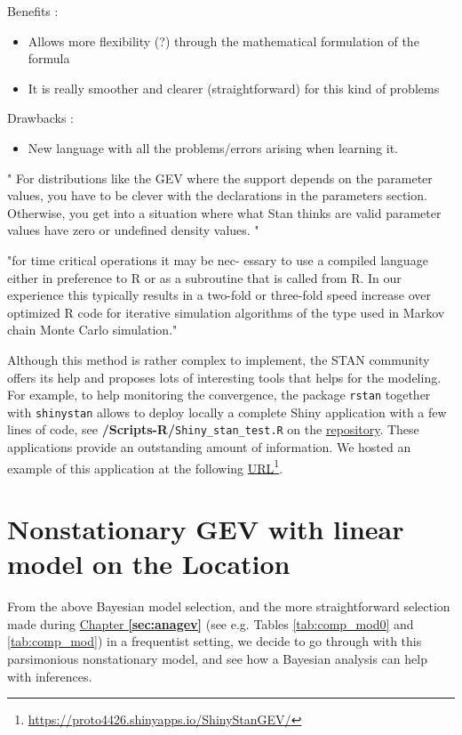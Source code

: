  Benefits : 
 
 \begin{itemize}
 	\item Allows more flexibility (?) through the mathematical formulation of the formula
 	\item It is really smoother and clearer (straightforward) for this kind of problems 
 \end{itemize}
 
 Drawbacks : 
 
 \begin{itemize}
 	\item New language with all the problems/errors arising when learning it. 
 \end{itemize}
 
 
 " For distributions like the GEV where the support depends on the parameter values, you have to be clever with the declarations in the parameters section. Otherwise, you get into a situation where what Stan thinks are valid parameter values have zero or undefined density values.  "
 
 
 "for time critical operations it may be nec-
 essary to use a compiled language either in preference to R or as a subroutine that
 is called from R. In our experience this typically results in a two-fold or three-fold
 speed increase over optimized R code for iterative simulation algorithms of the type
 used in Markov chain Monte Carlo simulation."
 
 
 Although this method is rather complex to implement, the STAN community offers its help and proposes lots of interesting tools that helps for the modeling. For example, to help monitoring the convergence, the package \texttt{rstan} together with \texttt{shinystan}
 allows to deploy locally a complete Shiny application with a few lines of code, see \textbf{/Scripts-R/}\texttt{Shiny\_stan\_test.R} on the \href{https://github.com/proto4426/PissoortThesis/}{repository}. These applications provide an outstanding amount of information. We hosted an example of this application at the following \href{https://proto4426.shinyapps.io/ShinyStanGEV/}{URL}\footnote{\url{https://proto4426.shinyapps.io/ShinyStanGEV/}}.
 

\section{Nonstationary GEV with linear model on the Location}\label{sec:bay_nonsta}


From the above Bayesian model selection, and the more straightforward selection made during \hyperref[sec:anagev]{Chapter \textbf{\ref{sec:anagev}}} (see e.g. Tables \ref{tab:comp_mod0} and \ref{tab:comp_mod}) in a frequentist setting, we decide to go through with this parsimonious nonstationary model, and see how a Bayesian analysis can help with inferences.


